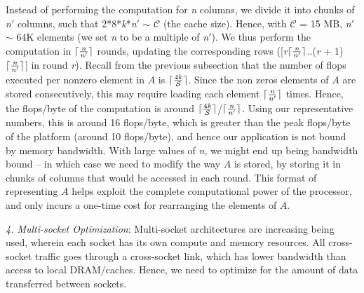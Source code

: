      Instead of performing the computation for {\it{n}} columns, we
     divide it into chunks of {\it{n}}$'$ columns, such that
     2*8*{\it{k}}*{\it{n}}$'$ $\sim$ $\mathcal{C}$ (the cache size). Hence, with
     $\mathcal{C}$ = 15 MB,  {\it{n}}$'$$\sim$ 64K elements (we set
     {\it{n}} to be a multiple of {\it{n}}$'$). %
     We thus perform the computation in
     $\lceil\frac{\it{n}}{\it{n}'}\rceil$ rounds, 
     updating the corresponding rows
     ([{\it{r}}$\lceil\frac{\it{n}}{\it{n}'}\rceil$..({\it{r}} +
     1)$\lceil\frac{\it{n}}{\it{n}'}\rceil$]
     in round {\it{r}}).
     Recall from the previous subsection that the number of flops
     executed per nonzero element in $A$ is
     $\lceil\frac{4{\it{k}}}{\mathcal{S}}\rceil$.
     Since the non zeros elements of $A$ are stored consecutively, 
     this may require loading each element
     $\lceil\frac{\it{n}}{\it{n}'}\rceil$ times. Hence, the flops/byte
     of the computation is around
     $\lceil\frac{4{\it{k}}}{\mathcal{S}}\rceil$/$\lceil\frac{\it{n}}{\it{n}'}\rceil$.
     Using our representative numbers, this is around 16 flops/byte,
     which is greater than the peak flops/byte of the platform (around
     10 flops/byte), and
     hence our application is not bound by memory bandwidth. With
     large values of {\it{n}}, we might end up being bandwidth bound
     -- in which case we need to modify the way $A$ is stored, by
     storing it in chunks of columns that would be accessed in each
     round. This format of representing $A$  helps 
     exploit the complete computational power of the processor, 
     and only incurs a
     one-time cost for rearranging the elements of $A$.

     

     \vspace*{0.05in}
     {\it{4. Multi-socket Optimization}}: 
     Multi-socket architectures are increasing being used,
     wherein each socket has its own
     compute and memory resources. 
     All cross-socket traffic goes through a
     cross-socket link, which has lower bandwidth than access to local
     DRAM/caches. Hence, we need to optimize for the amount of data
     transferred between sockets. %

